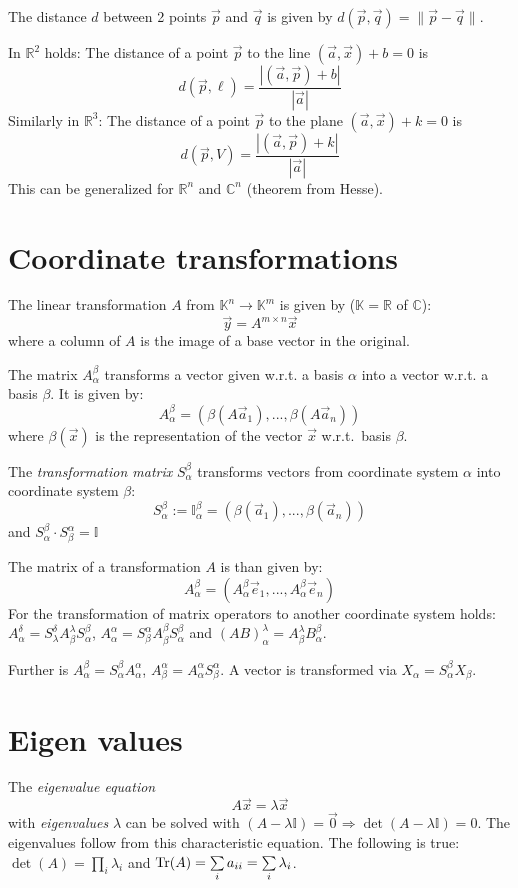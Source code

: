 The distance $d$ between 2 points $\vec{p}$ and $\vec{q}$ is given by
$d(\vec{p},\vec{q})=\|\vec{p}-\vec{q}\|$.

In $ \mathbb{R}^2$ holds:
The distance of a point $\vec{p}$ to the line $(\vec{a},\vec{x})+b=0$ is
\[
d(\vec{p},\ell)=\frac{|(\vec{a},\vec{p})+b|}{|\vec{a}|}
\]
Similarly in $ \mathbb{R}^3$:
The distance of a point $\vec{p}$ to the plane $(\vec{a},\vec{x})+k=0$ is
\[
d(\vec{p},V)=\frac{|(\vec{a},\vec{p})+k|}{|\vec{a}|}
\]
This can be generalized for $ \mathbb{R}^n$ and $\mathbb{C}^n$ (theorem from Hesse).

\section{Coordinate transformations}
The linear transformation $A$ from $\mathbb{K}^n\rightarrow\mathbb{K}^m$ is given by
($\mathbb{K}= \mathbb{R}$ of $\mathbb{C}$):
\[
\vec{y}=A^{m\times n}\vec{x}
\]
where a column of $A$ is the image of a base vector in the original.

The matrix $A_\alpha^\beta$ transforms a vector given w.r.t. a basis
$\alpha$ into a vector w.r.t. a basis $\beta$. It is given by:
\[
A_\alpha^\beta=\left(\beta(A\vec{a}_1),...,\beta(A\vec{a}_n)\right)
\]
where $\beta(\vec{x})$ is the representation of the vector $\vec{x}$
w.r.t.\ basis $\beta$.

The {\it transformation matrix} $S_\alpha^\beta$ transforms vectors from
coordinate system $\alpha$ into coordinate system $\beta$:
\[
S_\alpha^\beta:= \mathbb{I}_\alpha^\beta=\left(\beta(\vec{a}_1),...,\beta(\vec{a}_n)\right)
\]
and $S_\alpha^\beta\cdot S_\beta^\alpha= \mathbb{I}$

The matrix of a transformation $A$ is than given by:
\[
A_\alpha^\beta=\left(A_\alpha^\beta\vec{e}_1,...,A_\alpha^\beta\vec{e}_n\right)
\]
For the transformation of matrix operators to another coordinate system holds:
$A_\alpha^\delta=S_\lambda^\delta A_\beta^\lambda S_\alpha^\beta$,
$A_\alpha^\alpha=S_\beta^\alpha A_\beta^\beta S_\alpha^\beta$ and
$(AB)_\alpha^\lambda=A_\beta^\lambda B_\alpha^\beta$.

Further is $A_\alpha^\beta=S_\alpha^\beta A_\alpha^\alpha$,
$A_\beta^\alpha=A_\alpha^\alpha S_\beta^\alpha$. A vector is transformed via
$X_\alpha=S_\alpha^\beta X_\beta$.

\section{Eigen values}
The {\it eigenvalue equation}
\[
A\vec{x}=\lambda\vec{x}
\]
with {\it eigenvalues} $\lambda$ can be solved with
$(A-\lambda \mathbb{I})=\vec{0}\Rightarrow\det(A-\lambda \mathbb{I})=0$. The eigenvalues
follow from this characteristic equation. The following is true:
$\det(A)=\prod\limits_i\lambda_i$ and
${\rm Tr}(A)=\sum\limits_ia_{ii}=\sum\limits_i\lambda_i$.
 
